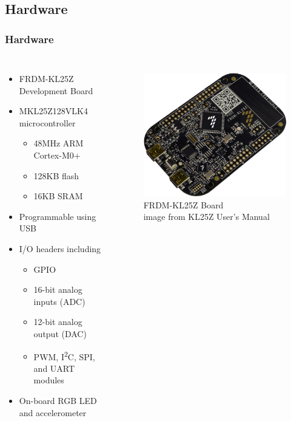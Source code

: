 \documentclass{beamer}
\begin{document}
\subsection{Hardware}
\begin{frame}
\frametitle{Hardware}
\begin{columns}[t]
\begin{itemize}
  \item FRDM-KL25Z Development Board
  \item MKL25Z128VLK4 microcontroller
  \begin{itemize}
    \item 48MHz ARM Cortex-M0+
    \item 128KB flash
    \item 16KB SRAM
  \end{itemize}
  \item Programmable using USB
  \item I/O headers including
  \begin{itemize}
    \item GPIO
    \item 16-bit analog inputs (ADC)
    \item 12-bit analog output (DAC)
    \item PWM, I\textsuperscript{2}C, SPI, and UART modules
  \end{itemize}
  \item On-board RGB LED and accelerometer
\end{itemize}

\begin{figure}
\centering
\includegraphics[width=1.0\columnwidth]{images-dis1/kl25z} \\
FRDM-KL25Z Board \\
{\tiny image from KL25Z User's Manual}
\end{figure}
\end{columns}
\end{frame}
\end{document}

